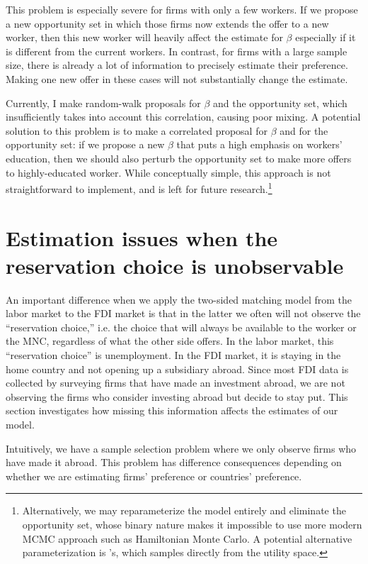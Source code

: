 This problem is especially severe for firms with only a few workers. If we
propose a new opportunity set in which those firms now extends the offer to a
new worker, then this new worker will heavily affect the estimate for $\beta$
especially if it is different from the current workers. In contrast, for firms
with a large sample size, there is already a lot of information to precisely estimate
their preference. Making one new offer in these cases will not substantially change the
estimate.

Currently, I make random-walk proposals for $\beta$ and the opportunity set,
which insufficiently takes into account this correlation, causing poor mixing. A
potential solution to this problem is to make a correlated proposal for $\beta$
and for the opportunity set: if we propose a new $\beta$ that
puts a high emphasis on workers' education, then we should also perturb the
opportunity set to make more offers to highly-educated worker. While
conceptually simple, this approach is not straightforward to implement, and is
left for future research.\footnote{Alternatively, we may reparameterize the
  model entirely and eliminate the opportunity set, whose binary nature makes it
impossible to use more modern MCMC approach such as Hamiltonian Monte Carlo. A
potential alternative parameterization is \citet{Logan2008}'s, which samples
directly from the utility space.}

\section{Estimation issues when the reservation choice is unobservable}
\label{sec:reservation_choice}

An important difference when we apply the two-sided matching model from the
labor market to the FDI market is that in the latter we often will not observe
the ``reservation choice,'' i.e. the choice that will always be available to the
worker or the MNC, regardless of what the other side offers. In the labor
market, this ``reservation choice'' is unemployment. In the FDI market, it is
staying in the home country and not opening up a subsidiary abroad. Since most
FDI data is collected by surveying firms that have made an investment abroad, we
are not observing the firms who consider investing abroad but decide to stay
put. This section investigates how missing this information affects the
estimates of our model.

Intuitively, we have a sample selection problem where we only observe firms who
have made it abroad. This problem has difference consequences depending on
whether we are estimating firms' preference or countries' preference.

